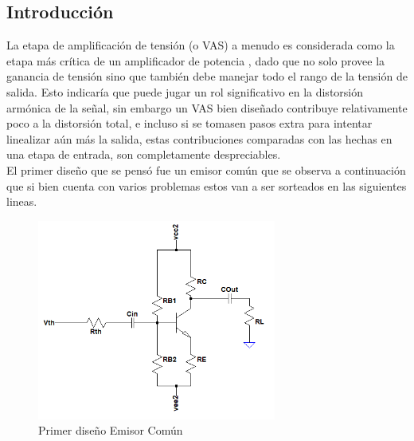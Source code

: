 



\subsection{Introducción}
La etapa de amplificación de tensión (o VAS) a menudo es considerada como la etapa más crítica de un amplificador de potencia , dado que no solo provee la ganancia de tensión sino que también debe manejar todo el rango de la tensión de salida. Esto indicaría que puede jugar un rol significativo en la distorsión armónica de la señal, sin embargo un VAS bien diseñado contribuye relativamente poco a la distorsión total, e incluso si se tomasen pasos extra para intentar linealizar aún más la salida, estas contribuciones comparadas con las hechas en una etapa de entrada, son completamente despreciables.\\

El primer diseño que se pensó fue un emisor común que se observa a continuación que si bien  cuenta con varios problemas estos van  a ser sorteados en las siguientes lineas.
\begin{figure}[H]
\centering
	\includegraphics[width=0.7\textwidth]{ImagenesGain-Stage/ec1.png}
	\caption{Primer diseño Emisor Común}
	\label{fig:ec1}
\end{figure}


